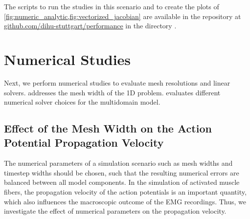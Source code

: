 \begin{reproduce_no_break}
  The scripts to run the studies in this scenario and to create the plots of \cref{fig:numeric_analytic,fig:vectorized_jacobian} are available in the repository at \href{https://github.com/dihu-stuttgart/performance}{github.com/dihu-stuttgart/performance}
  in the directory .
\end{reproduce_no_break}
%

\section{Numerical Studies}\label{sec:numerical_studies}

Next, we perform numerical studies to evaluate mesh resolutions and linear solvers. 
 addresses the mesh width of the 1D problem.  evaluates different numerical solver choices for the multidomain model.
\subsection{Effect of the Mesh Width on the Action Potential Propagation Velocity}\label{sec:action_potential_velocity}

The numerical parameters of a simulation scenario such as mesh widths and timestep widths should be chosen, such that the resulting numerical errors are balanced between all model components. In the simulation of activated muscle fibers, the propagation velocity of the action potentials is an important quantity, which also influences the macroscopic outcome of the EMG recordings. Thus, we investigate the effect of numerical parameters on the propagation velocity.


